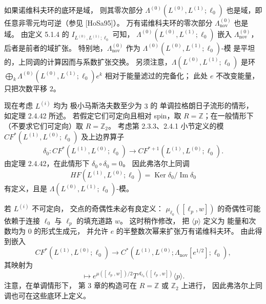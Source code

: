 如果诺维科夫环的底环是域，
则其零次部分
$\Lambda^{(0)}(L^{(0)},L^{(1)};\ell_0)$
也是域，即任意非零元均可逆（参见 [HoSa95]）。
万有诺维科夫环的零次部分
$\Lambda_{\mathrm{nov}}^{(0)}$ 也是域。
由定义 5.1.4 的
$I_{L^{(0)},L^{(1)};\ell_0}$ 可知，
$\Lambda^{(0)}(L^{(0)},L^{(1)};\ell_0)$
嵌入 $\Lambda_{\mathrm{nov}}^{(0)}$，
后者是前者的域扩张。
特别地，$\Lambda_{\mathrm{nov}}^{(0)}$
作为 $\Lambda^{(0)}(L^{(0)},L^{(1)};\ell_0)$-模
是平坦的，上同调的计算因而与系数扩张交换。
另须注意，$\Lambda(L^{(0)},L^{(1)};\ell_0)$
是环
$\bigoplus_k\Lambda^{(0)}(L^{(0)},L^{(1)};\ell_0)e^k$
相对于能量滤过的完备化；
此处 $e$ 不改变能量，只把次数平移 $2$。

现在考虑 $L^{(i)}$ 均为
极小马斯洛夫数至少为 $3$ 的
单调拉格朗日子流形的情形，
如定理 2.4.42 所述。
若假定它们可定向且相对 spin，取
$R=\mathbb Z$；在一般情形下
（不要求它们可定向）取 $R=\mathbb Z_2$。
考虑第 2.3.3、2.4.1 小节定义的模
$CF^*(L^{(1)},L^{(0)};\ell_0)$
及上边界算子
\[
\delta_0:CF^*(L^{(1)},L^{(0)};\ell_0)
\longrightarrow
CF^{*+1}(L^{(1)},L^{(0)};\ell_0).
\]
由定理 2.4.42，在此情形下
$\delta_0\circ\delta_0=0$。
因此弗洛尔上同调
\[
HF(L^{(1)},L^{(0)};\ell_0)
=\operatorname{Ker}\delta_0/\operatorname{Im}\delta_0
\]
有定义，且是
$\Lambda(L^{(0)},L^{(1)};\ell_0)$-模。

若 $L^{(i)}$ 不可定向，
交点的奇偶性未必有良定义：
$\mu_{\ell_0}([\ell_p,w])$
的奇偶性可能依赖于连接 $\ell_0$ 与 $\ell_p$
的填充道路 $w$。
这时稍作修改，
把 $\langle p\rangle$ 定义为
能量和次数均为 $0$ 的形式生成元，
并允许 $e$ 的半整数次幂来扩张万有诺维科夫环。
由此得到嵌入
\begin{equation}
CF^*(L^{(1)},L^{(0)};\ell_0)
\longrightarrow
C^*(L^{(1)},L^{(0)};
\Lambda_{\mathrm{nov}}[e^{1/2}];\ell_0),
\tag{5.1.16.1}\label{eq:5-1-16-1}
\end{equation}
其映射为
\begin{equation}
[\ell_p,w]\longmapsto
e^{\mu([\ell_p,w])/2}
T^{\mathcal A_{\ell_0}([\ell_p,w])}
\langle p\rangle.
\tag{5.1.16.2}\label{eq:5-1-16-2}
\end{equation}
注意，在单调情形下，
第 3 章的构造可在
$R=\mathbb Z$ 或 $\mathbb Z_2$ 上进行，
因此弗洛尔上同调也可在这些底环上定义。

